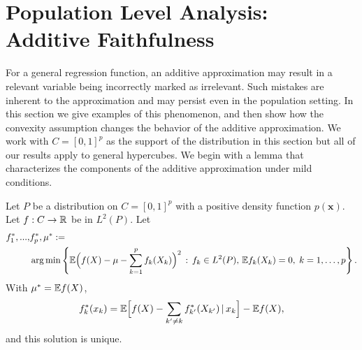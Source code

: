 
\section{Population Level Analysis: Additive Faithfulness}
\label{sec:additivefaithful}

For a general regression function, an additive approximation may result in a
relevant variable being incorrectly marked as irrelevant. Such
mistakes are inherent to the approximation and may persist even in
the population setting.  In this section we give
examples of this phenomenon, and then show how the convexity
assumption
changes the behavior of the additive approximation. We work with $C=[0,1]^p$ as the support of the distribution in this section but all of our results apply to general hypercubes. We begin
with a lemma that characterizes the components of the additive approximation under mild conditions. 



\begin{lemma}
\label{lem:general_int_reduction}
Let $P$ be a distribution on $C=[0,1]^p$ with a positive density
function $p(\mathbf{x})$. Let $f: C \rightarrow {\mathbb R}$ be in $L^2(P)$. Let
\begin{align*}
f^*_1,...,&f^*_p, \mu^* :=  \\
&\arg\min \left\{ {\mathbb E} \Bigl( f(X) - \mu - \sum_{k=1}^p f_k(X_k)\Bigr)^2 \,:\,
f_k \in L^2(P),\, {\mathbb E} f_k(X_k) = 0,\; k=1,\ldots, p \right\}.
\end{align*}
With $\mu^* = {\mathbb E} f(X)$, 
\begin{equation}
\label{eq:backfit}
f^*_k(x_k) = {\mathbb E}\Bigl[ f(X) - \sum_{k' \neq k} f^*_{k'}(X_{k'}) {\,|\,}
x_k\Bigr] - {\mathbb E} f(X), 
\end{equation}
and this solution is unique. 
\end{lemma}


